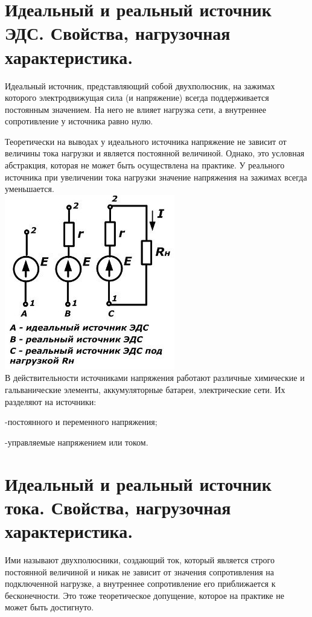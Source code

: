 \documentclass[a4paper, 12pt]{article}
\begin{document}
\section{Идеальный и реальный источник ЭДС. Свойства, нагрузочная характеристика.}
Идеальный источник, представляющий собой двухполюсник, на зажимах которого электродвижущая сила (и напряжение) всегда поддерживается постоянным значением. На него не влияет нагрузка сети, а внутреннее сопротивление у источника равно нулю. 

Теоретически на выводах у идеального источника напряжение не зависит от величины тока нагрузки и является постоянной величиной. Однако, это условная абстракция, которая не может быть осуществлена на практике. У реального источника при увеличении тока нагрузки значение напряжения на зажимах всегда уменьшается.\\ 
\includegraphics[scale=0.8]{6-1.png}\\
В действительности источниками напряжения работают различные химические и гальванические элементы, аккумуляторные батареи, электрические сети. Их разделяют на источники: 

    -постоянного и переменного напряжения; 

    -управляемые напряжением или током.
\section{Идеальный и реальный источник тока. Свойства, нагрузочная характеристика.}
Ими называют двухполюсники, создающий ток, который является строго постоянной величиной и никак не зависит от значения сопротивления на подключенной нагрузке, а внутреннее сопротивление его приближается к бесконечности. Это тоже теоретическое допущение, которое на практике не может быть достигнуто. 
\end{document}
